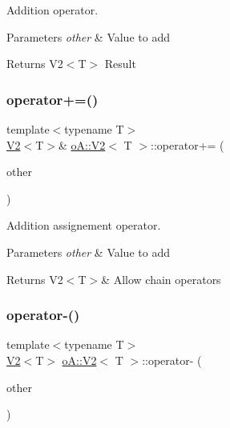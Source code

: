 Addition operator. 


\begin{DoxyParams}{Parameters}
{\em other} & Value to add \\
\hline
\end{DoxyParams}
\begin{DoxyReturn}{Returns}
V2$<$\+T$>$ Result 
\end{DoxyReturn}
\mbox{\label{structo_a_1_1_v2_ab5f783ae5cda46636a17dda5bc552a13}} 
\subsubsection{\texorpdfstring{operator+=()}{operator+=()}}
{\footnotesize\ttfamily template$<$typename T$>$ \\
\mbox{\hyperlink{structo_a_1_1_v2}{V2}}$<$T$>$\& \mbox{\hyperlink{structo_a_1_1_v2}{o\+A\+::\+V2}}$<$ T $>$\+::operator+= (\begin{DoxyParamCaption}\item[{const \mbox{\hyperlink{structo_a_1_1_v2}{o\+A\+::\+V2}}$<$ T $>$ \&}]{other }\end{DoxyParamCaption})\hspace{0.3cm}{\ttfamily [inline]}}



Addition assignement operator. 


\begin{DoxyParams}{Parameters}
{\em other} & Value to add \\
\hline
\end{DoxyParams}
\begin{DoxyReturn}{Returns}
V2$<$\+T$>$\& Allow chain operators 
\end{DoxyReturn}
\mbox{\label{structo_a_1_1_v2_af1a6777d0bae8bbe2aeee4f15da03162}} 
\subsubsection{\texorpdfstring{operator-\/()}{operator-()}}
{\footnotesize\ttfamily template$<$typename T$>$ \\
\mbox{\hyperlink{structo_a_1_1_v2}{V2}}$<$T$>$ \mbox{\hyperlink{structo_a_1_1_v2}{o\+A\+::\+V2}}$<$ T $>$\+::operator-\/ (\begin{DoxyParamCaption}\item[{const \mbox{\hyperlink{structo_a_1_1_v2}{o\+A\+::\+V2}}$<$ T $>$ \&}]{other }\end{DoxyParamCaption})\hspace{0.3cm}{\ttfamily [inline]}}



